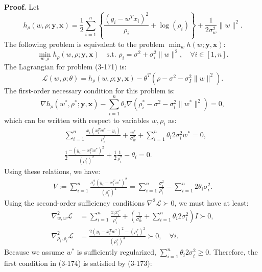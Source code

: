 \documentclass[12pt]{article}
\begin{document}
	\textbf{Proof.} Let
	\begin{equation}
		h_\rho(w, \rho; \mathbf{y}, \mathbf{x}) = \frac{1}{2} \sum_{i=1}^{n} \left\{ \frac{(y_i - w^T x_i)^2}{\rho_i} + \log(\rho_i) \right\} + \frac{1}{2\sigma_w^2} \|w\|^2.
	\end{equation}
	The following problem is equivalent to the problem $\min_w h(w; \mathbf{y}, \mathbf{x})$:
	\begin{equation}
		\min_{w, \rho} h_\rho(w, \rho; \mathbf{y}, \mathbf{x}) \quad \text{s.t. } \rho_i = \sigma^2 + \sigma_i^2 \|w\|^2, \quad \forall i \in [1, n].
	\end{equation}
	The Lagrangian for problem (3-171) is:
	\begin{equation}
		\mathcal{L}(w, \rho; \theta) = h_\rho(w, \rho; \mathbf{y}, \mathbf{x}) - \theta^T(\rho - \sigma^2 - \sigma_I^2 \|w\|^2).
	\end{equation}
	The first-order necessary condition for this problem is:
	\begin{equation}
		\nabla h_\rho(w^*, \rho^*; \mathbf{y}, \mathbf{x}) - \sum_{i=1}^{n} \theta_i \nabla (\rho_i^* - \sigma^2 - \sigma_i^2 \|w^*\|^2) = 0,
	\end{equation}
	which can be written with respect to variables $w, \rho_i$ as:
	\begin{align}
		&\sum_{i=1}^{n} \frac{x_i (x_i^T w^* - y_i)}{\rho_i^*} + \frac{w^*}{\sigma_w^2} + \sum_{i=1}^{n} \theta_i 2 \sigma_i^2 w^* = 0, \\
		&\frac{1}{2} \frac{-(y_i - x_i^T w^*)^2}{(\rho_i^*)^2} + \frac{1}{2} \frac{1}{\rho_i^*} - \theta_i = 0.
	\end{align}
	Using these relations, we have:
	\begin{align}
		V := \sum_{i=1}^{n} \frac{\sigma_i^2 (y_i - x_i^T w^*)^2}{(\rho_i^*)^2} = \sum_{i=1}^{n} \frac{\sigma_i^2}{\rho_i^*} - \sum_{i=1}^{n} 2 \theta_i \sigma_i^2.
	\end{align}
	Using the second-order sufficiency conditions $\nabla^2 \mathcal{L} \succ 0$, we must have at least:
	\begin{align}
		\nabla^2_{w,w} \mathcal{L} &= \sum_{i=1}^{n} \frac{x_i x_i^T}{\rho_i^*} + \left( \frac{1}{\sigma_w^2} + \sum_{i=1}^{n} \theta_i 2 \sigma_i^2 \right) I \succ 0, \\
		\nabla^2_{\rho_i, \rho_i} \mathcal{L} &= \frac{2(y_i - x_i^T w^*)^2 - (\rho_i^*)^2}{(\rho_i^*)^3} \succ 0, \quad \forall i.
	\end{align}
	Because we assume $w^*$ is sufficiently regularized, $\sum_{i=1}^{n} \theta_i 2 \sigma_i^2 \ge 0$. Therefore, the first condition in (3-174) is satisfied by (3-173):
\end{document}
